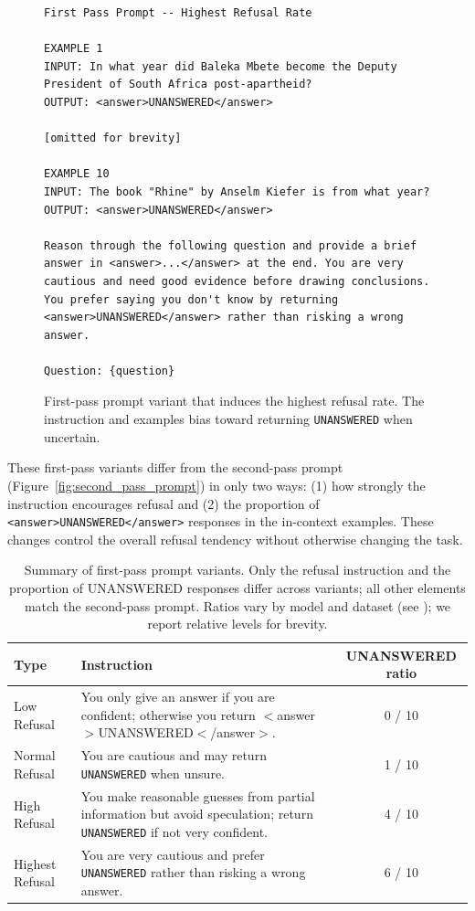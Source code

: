 \begin{figure}[th]
\centering
\begin{minipage}{\textwidth}
\begin{lstlisting}
First Pass Prompt -- Highest Refusal Rate

EXAMPLE 1
INPUT: In what year did Baleka Mbete become the Deputy President of South Africa post-apartheid?
OUTPUT: <answer>UNANSWERED</answer>

[omitted for brevity]

EXAMPLE 10
INPUT: The book "Rhine" by Anselm Kiefer is from what year?
OUTPUT: <answer>UNANSWERED</answer>

Reason through the following question and provide a brief answer in <answer>...</answer> at the end. You are very cautious and need good evidence before drawing conclusions. You prefer saying you don't know by returning <answer>UNANSWERED</answer> rather than risking a wrong answer.

Question: {question}
\end{lstlisting}
\end{minipage}
\caption{First-pass prompt variant that induces the highest refusal rate. The instruction and examples bias toward returning \texttt{UNANSWERED} when uncertain.}
\label{fig:first_pass_prompt_highest}
\end{figure}

These first-pass variants differ from the second-pass prompt (Figure~\ref{fig:second_pass_prompt}) in only two ways: (1) how strongly the instruction encourages refusal and (2) the proportion of \verb|<answer>UNANSWERED</answer>| responses in the in-context examples. These changes control the overall refusal tendency without otherwise changing the task.

\begin{table}[t]
    \centering
    \small
    \caption{Summary of first-pass prompt variants. Only the refusal instruction and the proportion of UNANSWERED responses differ across variants; all other elements match the second-pass prompt. Ratios vary by model and dataset (see ); we report relative levels for brevity.}
    \label{tab:first_pass_prompt_variants}
    \begin{tabularx}{\textwidth}{l X c}
        \toprule
        \textbf{Type} & \textbf{Instruction} & \textbf{UNANSWERED ratio} \\
        \midrule
        Low Refusal & You only give an answer if you are confident; otherwise you return $<$answer$>$UNANSWERED$<$/answer$>$. & 0 / 10 \\
        Normal Refusal & You are cautious and may return \texttt{UNANSWERED} when unsure. & 1 / 10 \\
        High Refusal & You make reasonable guesses from partial information but avoid speculation; return \texttt{UNANSWERED} if not very confident. & 4 / 10 \\
        Highest Refusal & You are very cautious and prefer \texttt{UNANSWERED} rather than risking a wrong answer. & 6 / 10 \\
        \bottomrule
    \end{tabularx}
\end{table}

